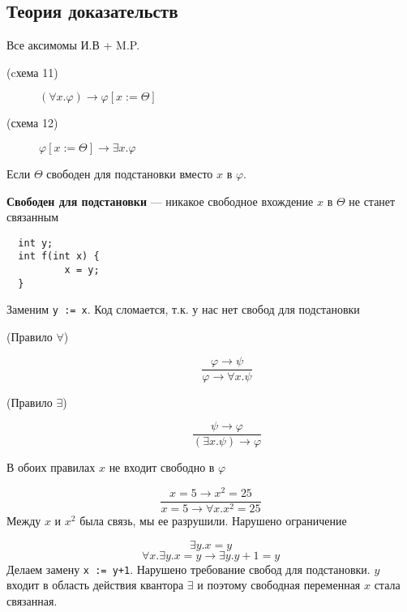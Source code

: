 \documentclass[english]{article}
\begin{document}
\subsection{Теория доказательств}
\label{sec:orga92431f}
Все аксимомы И.В + M.P.
\begin{description}
	\item[{(cхема 11)}] \((\forall x. \varphi) \to \varphi[x:=\Theta]\)
	\item[{(схема 12)}] \(\varphi[x:=\Theta]\to \exists x. \varphi\)
\end{description}
Если \(\Theta\) свободен для подстановки вместо \(x\) в \(\varphi\).
\begin{definition}
	\textbf{Свободен для подстановки} --- никакое свободное вхождение \(x\) в \(\Theta\) не станет связанным
\end{definition}
\begin{examp}
	\-
	\begin{verbatim}
  int y;
  int f(int x) {
          x = y;
  }
\end{verbatim}
	Заменим \texttt{y := x}. Код сломается, т.к. у нас нет свобод для подстановки
\end{examp}
\begin{description}
	\item[{(Правило \(\forall\))}] \[\frac{\varphi \to \psi}{\varphi \to \forall x. \psi}\]
	\item[{(Правило \(\exists\))}] \[ \frac{\psi \to \varphi}{(\exists x.\psi) \to \varphi} \]
\end{description}
В обоих правилах \(x\) не входит свободно в \(\varphi\)
\begin{examp}
	\[ \frac{x = 5 \to x^2 = 25}{x = 5 \to \forall x. x^2 = 25} \]
	Между \(x\) и \(x^2\) была связь, мы ее разрушили. Нарушено ограничение
\end{examp}
\begin{examp}
	\[ \exists y. x = y \]
	\[ \forall x. \exists y. x = y \to \exists y. y + 1 = y \]
	Делаем замену \texttt{x := y+1}. Нарушено требование свобод для подстановки. \(y\) входит в область действия квантора \(\exists\) и поэтому свободная переменная \(x\) стала связанная.
\end{examp}
\end{document}
